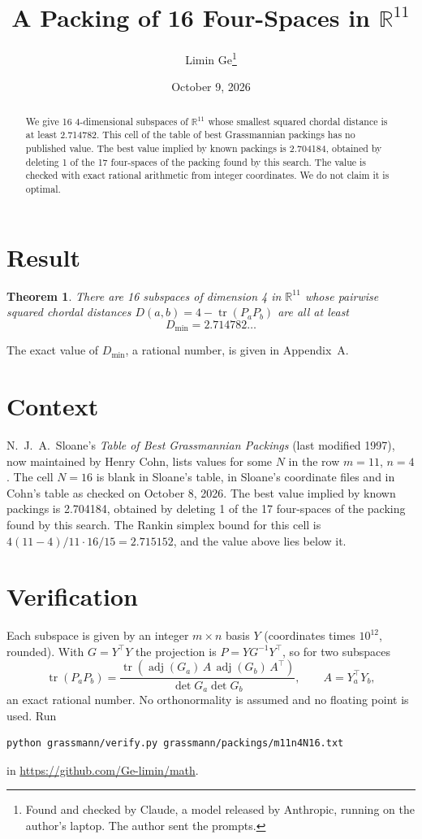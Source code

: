 \documentclass[11pt,a4paper]{article}
\title{A Packing of 16 Four-Spaces in $\mathbb{R}^{11}$}
\author{Limin Ge\thanks{Found and checked by Claude, a model released by Anthropic, running on the author's laptop. The author sent the prompts.}}
\date{October 9, 2026}
\newtheorem*{theorem}{Theorem}
\begin{document}
\maketitle
\begin{abstract}
We give 16 4-dimensional subspaces of $\mathbb{R}^{11}$ whose smallest squared chordal distance is at least 2.714782. This cell of the table of best Grassmannian packings has no published value. The best value implied by known packings is 2.704184, obtained by deleting 1 of the 17 four-spaces of the packing found by this search. The value is checked with exact rational arithmetic from integer coordinates. We do not claim it is optimal.
\end{abstract}

\section{Result}
\begin{theorem}
There are 16 subspaces of dimension 4 in $\mathbb{R}^{11}$ whose pairwise squared chordal distances $D(a,b) = 4 - \operatorname{tr}(P_aP_b)$ are all at least
\[ D_{\min} = 2.714782\ldots \]
\end{theorem}
The exact value of $D_{\min}$, a rational number, is given in Appendix~A.


\section{Context}
N.~J.~A.~Sloane's \emph{Table of Best Grassmannian Packings} (last modified 1997), now maintained by Henry Cohn, lists values for some $N$ in the row $m=11$, $n=4$. The cell $N=16$ is blank in Sloane's table, in Sloane's coordinate files and in Cohn's table as checked on October 8, 2026. The best value implied by known packings is 2.704184, obtained by deleting 1 of the 17 four-spaces of the packing found by this search. The Rankin simplex bound for this cell is $4(11-4)/11\cdot 16/15 = 2.715152$, and the value above lies below it.


\section{Verification}
Each subspace is given by an integer $m\times n$ basis $Y$ (coordinates times $10^{12}$, rounded). With $G=Y^\top Y$ the projection is $P=YG^{-1}Y^\top$, so for two subspaces
\[ \operatorname{tr}(P_aP_b)=\frac{\operatorname{tr}(\operatorname{adj}(G_a)\,A\,\operatorname{adj}(G_b)\,A^\top)}{\det G_a\det G_b},\qquad A=Y_a^\top Y_b, \]
an exact rational number. No orthonormality is assumed and no floating point is used. Run
\begin{verbatim}
python grassmann/verify.py grassmann/packings/m11n4N16.txt
\end{verbatim}
in \url{https://github.com/Ge-limin/math}.
\end{document}
